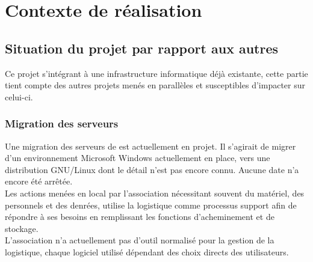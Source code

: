 
\section{Contexte de réalisation}

\subsection{Situation du projet par rapport aux autres}
Ce projet s'intégrant à une infrastructure informatique déjà existante, cette partie tient compte des autres projets menés en parallèles et susceptibles d'impacter sur celui-ci.

\subsubsection{Migration des serveurs}
Une migration des serveurs de \mo est actuellement en projet. Il s'agirait de migrer d'un environnement Microsoft Windows actuellement en place, vers une distribution GNU/Linux dont le détail n'est pas encore connu. Aucune date n'a encore été arrêtée.
\\
Les actions menées en local par l'association nécessitant souvent du matériel, des personnels et des denrées,  utilise la logistique comme processus support afin de répondre à ses besoins en remplissant les fonctions d'acheminement et de stockage.
\\
L'association n'a actuellement pas d'outil normalisé pour la gestion de la logistique, chaque logiciel utilisé dépendant des choix directs des utilisateurs.


